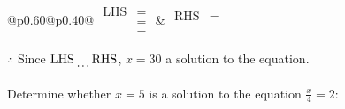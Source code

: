 \documentclass[12pt]{article}
\newcounter{minipagecount}
\begin{document}
\begin{multicols}{2}
\begin{minipage}[t]{0.40\textwidth}
    \noindent
    \renewcommand{\arraystretch}{1.3} %
    \begin{tabular}{@{}p{0.60\linewidth}@{}p{0.40\linewidth}@{}}
        \(\begin{aligned}
            \text{LHS} &=  \\
                    &=  \\
                    &= 
        \end{aligned}\) &
        \(\begin{aligned}
            \text{RHS} &= \\
                    & \\
                    &
        \end{aligned}\)
    \end{tabular}
    \renewcommand{\arraystretch}{1.0} %
    \vspace{2pt}  %

    \noindent \(\therefore\) Since \(\text{LHS} \dotuline{\hspace{5mm}} \text{RHS}\), \(x = 30\) \dotuline{\hspace{12mm}} a solution to the equation.

\end{minipage}

\vspace*{0.5ex}
\vfill{}
\noindent{(\theminipagecount)}\hspace{0.1mm} %
\begin{minipage}[t]{0.40\textwidth} %

    \noindent Determine whether \(x = 5\) is a solution to the equation \(\frac{x}{4} = 2\):
    \vspace{2pt}  %


\end{minipage}
\end{multicols}
\end{document}
